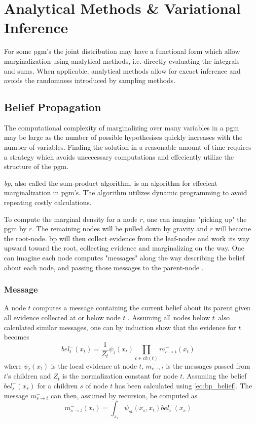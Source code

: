 \chapter{Analytical Methods \& Variational Inference}
For some \acrshort{pgm}'s the joint distribution may have a functional form which allow marginalization using analytical methods, i.e. directly evaluating the integrals and sums. When applicable, analytical methods allow for excact inference and avoids the randomness introduced by sampling methods. %

\section{Belief Propagation}
The computational complexity of marginalizing over many variables in a \acrshort{pgm} may be large as the number of possible hypothesises quickly increases with the number of variables. Finding the solution in a reasonable amount of time requires a strategy which avoids uneccessary computations and effeciently utilize the structure of the \acrshort{pgm}. 

\textit{\acrfull{bp}}, also called the sum-product algorithm, is an algorithm for effecient marginalization in \acrshort{pgm}'s. The algorithm utilizes dynamic programming to avoid repeating costly calculations.

To compute the marginal density for a node $r$, one can imagine "picking up" the \acrshort{pgm} by $r$. The remaining nodes will be pulled down by gravity and $r$ will become the root-node. \acrshort{bp} will then collect evidence from the leaf-nodes and work its way upward toward the root, collecting evidence and marginalizing on the way. One can imagine each node computes "messages" along the way describing the belief about each node, and passing those messages to the parent-node \cite{murphy}.
\subsection{Message}
A node $t$ computes a message containing the current belief about its parent given all evidence collected at or below node $t$ \cite{murphy}. Assuming all nodes below $t$ also calculated similar messages, one can by induction show that the evidence for $t$ becomes
\begin{equation}\label{eq:bp_belief}
    bel_t^-(x_t) = \frac{1}{Z_t}\psi_t(x_t) \prod_{c \in ch(t)} m_{c\to t}^-(x_t)
\end{equation}
where $\psi_t(x_t)$ is the local evidence at node $t$, $m_{c \to t}^-$ is the messages passed from $t$'s children and $Z_t$ is the normalization constant for node $t$.
Assuming the belief $bel_s^-(x_s)$ for a children $s$ of node $t$ has been calculated using \cref{eq:bp_belief}. The message $m_{s\to t}^-$ can then, assumed by recursion, be computed as
\begin{equation}\label{eq:bp_message}
    m_{s \to t}^-(x_t) = \int_{x_s} \psi_{st}(x_s, x_t) bel_s^-(x_s)
\end{equation}

